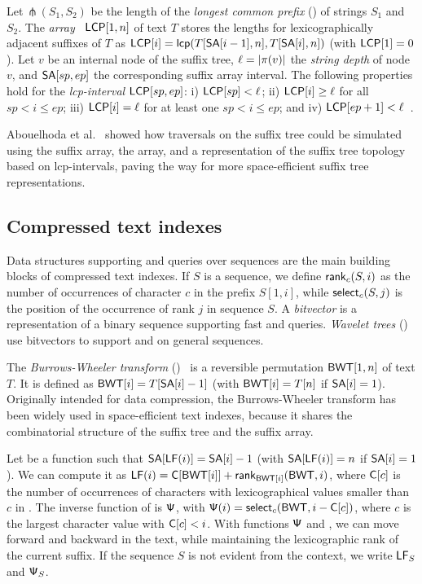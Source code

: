 Let $\mlcp(S_{1}, S_{2})$ be the length of the \emph{longest common prefix}
(\LCP) of strings $S_{1}$ and $S_{2}$. The \LCP{}
\emph{array}~\cite{Manber1993} $\mathsf{LCP}[1,n]$ of text $T$ stores the \LCP{}
lengths for lexicographically adjacent suffixes of $T$ as $\mathsf{LCP}[i] =
\mathsf{lcp}(T[\mathsf{SA}[i-1],n], T[\mathsf{SA}[i],n])$ (with $\mathsf{LCP}[1] = 0$). Let $v$ be an internal node of the
suffix tree, $\ell = \lvert \pi(v) \rvert$ the \emph{string depth} of node $v$, and
$\mathsf{SA}[sp,ep]$ the corresponding suffix array interval. The following
properties hold for the \emph{lcp-interval} $\mathsf{LCP}[sp,ep]$: i) $\mathsf{LCP}[sp] <
\ell$; ii) $\mathsf{LCP}[i] \ge \ell$ for all $sp < i \le ep$; iii) $\mathsf{LCP}[i] = \ell$
for at least one $sp < i \le ep$; and iv) $\mathsf{LCP}[ep+1] <
\ell$~\cite{Abouelhoda2004}.

Abouelhoda et al.~\cite{Abouelhoda2004} showed how traversals on the suffix
tree could be simulated using the suffix array, the \LCP{} array, and a
representation of the suffix tree topology based on lcp-intervals, paving
the way for more space-efficient suffix tree representations.

\subsection{Compressed text indexes}

Data structures supporting \rank{} and \select{} queries over sequences are
the main building blocks of compressed text indexes. If $S$ is a sequence, we
define $\mathsf{rank}_{c}(S,i)$ as the number of occurrences of character $c$ in
the prefix $S[1,i]$, while $\mathsf{select}_{c}(S,j)$ is the position of the occurrence
of rank $j$ in sequence $S$. A \emph{bitvector} is a representation of a
binary sequence supporting fast \rank{} and \select{} queries.
\emph{Wavelet trees} (\WT)~\cite{Grossi2003} use bitvectors to support \rank{}
and \select{} on general sequences.

The \emph{Burrows-Wheeler transform} (\BWT)~\cite{Burrows1994} is a reversible
permutation $\mathsf{BWT}[1,n]$ of text $T$. It is defined as $\mathsf{BWT}[i] = T[\mathsf{SA}[i] -
1]$ (with $\mathsf{BWT}[i] = T[n]$ if $\textsf{SA}[i] = 1$). Originally intended for data
compression, the Burrows-Wheeler transform has been widely used in
space-efficient text indexes, because it shares the combinatorial structure of
the suffix tree and the suffix array.

Let \LF{} be a function such that $\mathsf{SA}[\mathsf{LF}(i)] = \mathsf{SA}[i] - 1$ (with
$\mathsf{SA}[\mathsf{LF}(i)] = n$ if $\mathsf{SA}[i] = 1$). We can compute it as $\mathsf{LF}(i) =
\mathsf{C}[\mathsf{BWT}[i]] + \mathsf{rank}_{\mathsf{BWT}[i]}(\mathsf{BWT}, i)$, where $\mathsf{C}[c]$ is the number of
occurrences of characters with lexicographical values smaller than $c$ in
\BWT. The inverse function of \LF{} is $\mathsf{\Psi}$, with $\mathsf{\Psi}(i) =
\mathsf{select}_{c}(\mathsf{BWT}, i - \mathsf{C}[c])$, where $c$ is the largest character value
with $\mathsf{C}[c] < i$. With functions $\mathsf{\Psi}$ and \LF, we can move forward and
backward in the text, while maintaining the lexicographic rank of the current
suffix. If the sequence $S$ is not evident from the context, we write $\mathsf{LF}_{S}$
and $\mathsf{\Psi}_{S}$.

